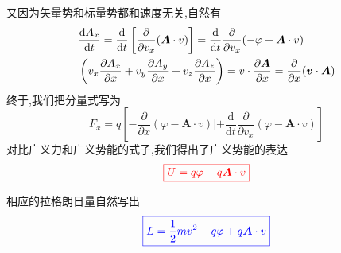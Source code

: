 又因为矢量势和标量势都和速度无关,自然有
\begin{equation}
    \begin{aligned} &\frac{\mathrm{d} A_{x}}{\mathrm{d} t}=\frac{\mathrm{d}}{\mathrm{d} t}\left[\frac{\partial}{\partial v_{x}}(\boldsymbol{A} \cdot v)\right]=\frac{\mathrm{d}}{\mathrm{d} t} \frac{\partial}{\partial v_{x}}(-\varphi+\boldsymbol{A} \cdot v)\\ &\left(v_{x} \frac{\partial A_{x}}{\partial x}+v_{y} \frac{\partial A_{y}}{\partial x}+v_{z} \frac{\partial A_{z}}{\partial x}\right)=v \cdot \frac{\partial \boldsymbol{A}}{\partial x}=\frac{\partial}{\partial x}(\boldsymbol{v} \cdot \boldsymbol{A}) \end{aligned}\\
\end{equation}
终于,我们把分量式写为
\begin{equation}
    F_{x}=q\left[-\frac{\partial}{\partial x}(\varphi-\boldsymbol{A} \cdot v) |+\frac{\mathrm{d}}{\mathrm{d} t} \frac{\partial}{\partial v_{x}}(\varphi-\boldsymbol{A} \cdot v)\right]
\end{equation}
对比广义力和广义势能的式子,我们得出了广义势能的表达
\begin{equation}
    \color{red}{\boxed{U=q \varphi-q \boldsymbol{A} \cdot v} }
\end{equation}

相应的拉格朗日量自然写出
\begin{equation}
    \color{blue}{\boxed{L=\frac{1}{2} m v^{2}-q \varphi+q \boldsymbol{A} \cdot v }}
\end{equation}






